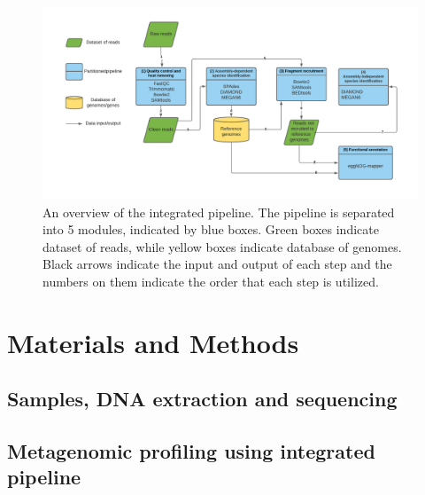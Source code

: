 \documentclass[11pt]{article}
\begin{document}
  \begin{figure}[H]
    \centering
    \includegraphics[width=\textwidth]{../Figures/FigurePipeline.pdf}
    \caption{An overview of the integrated pipeline. 
    The pipeline is separated into 5 modules, indicated by blue boxes. 
    Green boxes indicate dataset of reads, while yellow boxes indicate database of genomes. 
    Black arrows indicate the input and output of each step and the numbers on them indicate the order that each step is utilized.}
    \label{Pipeline}
  \end{figure}

  
  \section{Materials and Methods}
    \subsection{Samples, DNA extraction and sequencing}

    \subsection{Metagenomic profiling using integrated pipeline}
\end{document}
